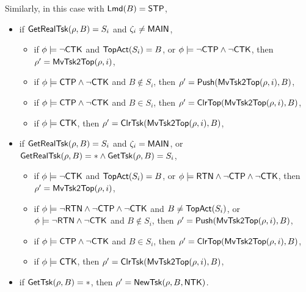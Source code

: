{Similarly, in this case with ${\sf Lmd}(B) = {\sf STP}$,
%
\begin{itemize}
    \item if $\mathsf{GetRealTsk}(\rho, B) = S_i$ and $\zeta_i\neq{\sf MAIN}$,
        \begin{itemize}
        \item if $\phi\models\neg{\sf CTK}$ and $\mathsf{TopAct}(S_i) = B$, 
            or $\phi\models\neg{\sf CTP}\wedge\neg{\sf CTK}$,
            then $\rho'=\mathsf{MvTsk2Top}(\rho, i)$,
        \item if $\phi\models{\sf CTP}\wedge\neg{\sf CTK}$ and $B\notin S_i$, 
            then $\rho'=\mathsf{Push}(\mathsf{MvTsk2Top}(\rho, i), B)$,
        \item if $\phi \models{\sf CTP}\wedge\neg{\sf CTK}$ and $B \in S_i$, then 
            $\rho' =\mathsf{ClrTop}(\mathsf{MvTsk2Top}(\rho, i), B)$,
        \item if $\phi \models{\sf CTK}$, then
        $\rho' = \mathsf{ClrTsk}(\mathsf{MvTsk2Top}(\rho, i), B)$,
        \end{itemize}
        \item if $\mathsf{GetRealTsk}(\rho, B) = S_i$ and $\zeta_i={\sf MAIN}$,
    or $ \mathsf{GetRealTsk}(\rho, B) = * \wedge \mathsf{GetTsk}(\rho, B) = S_i$, 
    \begin{itemize}
        \item if $\phi \models \neg{\sf CTK}$ and $\mathsf{TopAct}(S_i) = B$, 
        or $\phi\models{\sf RTN}\wedge\neg{\sf CTP}\wedge\neg{\sf CTK}$,
        then $\rho' = \mathsf{MvTsk2Top}(\rho, i)$,
        \item if $\phi\models\neg{\sf RTN}\wedge\neg{\sf CTP}\wedge\neg{\sf CTK}$ and $B\neq\mathsf{TopAct}(S_i)$,
            or $\phi\models\neg{\sf RTN}\wedge\neg{\sf CTK}$ and $B\notin S_i$,
                then $\rho'=\mathsf{Push}(\mathsf{MvTsk2Top}(\rho, i), B)$,
        \item if $\phi \models{\sf CTP}\wedge\neg{\sf CTK}$ and $B \in S_i$, 
            then $\rho' =\mathsf{ClrTop}(\mathsf{MvTsk2Top}(\rho, i), B)$,
        \item if $\phi \models{\sf CTK}$, then
        $\rho' = \mathsf{ClrTsk}(\mathsf{MvTsk2Top}(\rho, i), B)$,
    \end{itemize}
    \item if $\mathsf{GetTsk}(\rho, B) = *$, then $\rho' = \mathsf{NewTsk}(\rho, B, {\sf NTK})$.
\end{itemize}

}
